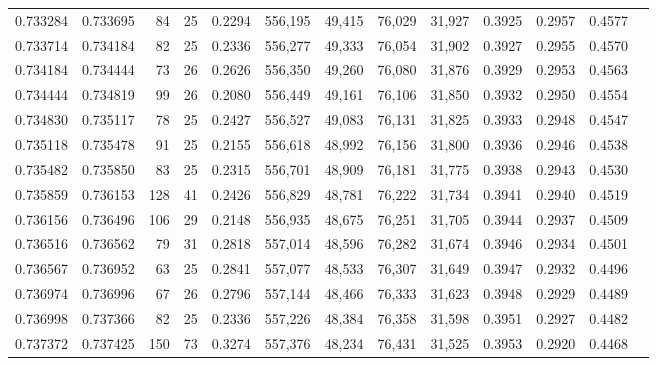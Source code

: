 \begin{tabular}{rrrrrrrrrrrrr}
0.733284 & 0.733695 &    84 &  25 &                                     0.2294 & 556,195 &  49,415 &  76,029 &  31,927 & 0.3925 & 0.2957 & 0.4577 \\
0.733714 & 0.734184 &    82 &  25 &                                     0.2336 & 556,277 &  49,333 &  76,054 &  31,902 & 0.3927 & 0.2955 & 0.4570 \\
0.734184 & 0.734444 &    73 &  26 &                                     0.2626 & 556,350 &  49,260 &  76,080 &  31,876 & 0.3929 & 0.2953 & 0.4563 \\
0.734444 & 0.734819 &    99 &  26 &                                     0.2080 & 556,449 &  49,161 &  76,106 &  31,850 & 0.3932 & 0.2950 & 0.4554 \\
0.734830 & 0.735117 &    78 &  25 &                                     0.2427 & 556,527 &  49,083 &  76,131 &  31,825 & 0.3933 & 0.2948 & 0.4547 \\
0.735118 & 0.735478 &    91 &  25 &                                     0.2155 & 556,618 &  48,992 &  76,156 &  31,800 & 0.3936 & 0.2946 & 0.4538 \\
0.735482 & 0.735850 &    83 &  25 &                                     0.2315 & 556,701 &  48,909 &  76,181 &  31,775 & 0.3938 & 0.2943 & 0.4530 \\
0.735859 & 0.736153 &   128 &  41 &                                     0.2426 & 556,829 &  48,781 &  76,222 &  31,734 & 0.3941 & 0.2940 & 0.4519 \\
0.736156 & 0.736496 &   106 &  29 &                                     0.2148 & 556,935 &  48,675 &  76,251 &  31,705 & 0.3944 & 0.2937 & 0.4509 \\
0.736516 & 0.736562 &    79 &  31 &                                     0.2818 & 557,014 &  48,596 &  76,282 &  31,674 & 0.3946 & 0.2934 & 0.4501 \\
0.736567 & 0.736952 &    63 &  25 &                                     0.2841 & 557,077 &  48,533 &  76,307 &  31,649 & 0.3947 & 0.2932 & 0.4496 \\
0.736974 & 0.736996 &    67 &  26 &                                     0.2796 & 557,144 &  48,466 &  76,333 &  31,623 & 0.3948 & 0.2929 & 0.4489 \\
0.736998 & 0.737366 &    82 &  25 &                                     0.2336 & 557,226 &  48,384 &  76,358 &  31,598 & 0.3951 & 0.2927 & 0.4482 \\
0.737372 & 0.737425 &   150 &  73 &                                     0.3274 & 557,376 &  48,234 &  76,431 &  31,525 & 0.3953 & 0.2920 & 0.4468 \\

\end{tabular}
